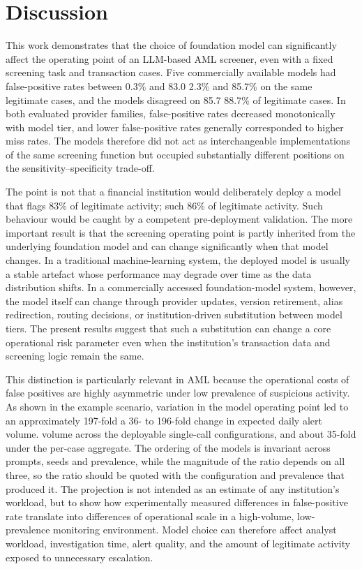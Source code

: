\documentclass[pdflatex,sn-basic,Numbered]{sn-jnl}
\newcommand{\HLtext}[1]{\texthl{#1}}
\newcommand{\HLdel}[1]{\textcolor{HLink}{\sout{#1}}}
\renewcommand{\HLtext}[1]{#1}\renewcommand{\HLdel}[1]{#1}%
\begin{document}
\section{Discussion}\label{sec:discussion}

This work demonstrates that the choice of foundation model can significantly affect the operating point of an LLM-based AML screener, even with a fixed screening task and transaction cases. Five commercially available models had false-positive rates between \HLdel{0.3\% and 83.0} \HLtext{2.3}\% \HLtext{and 85.7}\% on the same legitimate cases, and the models disagreed on \HLdel{85.7} \HLtext{88.7}\% of legitimate cases. In both evaluated provider families, false-positive rates decreased monotonically with model tier, and lower false-positive rates generally corresponded to higher miss rates. The models therefore did not act as interchangeable implementations of the same screening function but occupied substantially different positions on the sensitivity--specificity trade-off.

The point is not that a financial institution would deliberately deploy a model that flags \HLdel{83\% of legitimate activity; such} \HLtext{86}\% \HLtext{of legitimate activity. Such} behaviour would be caught by a competent pre-deployment validation. The more important result is that the screening operating point is partly inherited from the underlying foundation model and can change significantly when that model changes. In a traditional machine-learning system, the deployed model is usually a stable artefact whose performance may degrade over time as the data distribution shifts. In a commercially accessed foundation-model system, however, the model itself can change through provider updates, version retirement, alias redirection, routing decisions, or institution-driven substitution between model tiers. The present results suggest that such a substitution can change a core operational risk parameter even when the institution's transaction data and screening logic remain the same.

This distinction is particularly relevant in AML because the operational costs of false positives are highly asymmetric under low prevalence of suspicious activity. As shown in the example scenario, variation in the model operating point led to \HLdel{an approximately 197-fold} \HLtext{a 36- to 196-fold} change in expected daily alert \HLdel{volume.} \HLtext{volume across the deployable single-call configurations, and about 35-fold under the per-case aggregate. The ordering of the models is invariant across prompts, seeds and prevalence, while the magnitude of the ratio depends on all three, so the ratio should be quoted with the configuration and prevalence that produced it.} The projection is not intended as an estimate of any institution's workload, but to show how experimentally measured differences in false-positive rate translate into differences of operational scale in a high-volume, low-prevalence monitoring environment. Model choice can therefore affect analyst workload, investigation time, alert quality, and the amount of legitimate activity exposed to unnecessary escalation.
\end{document}

